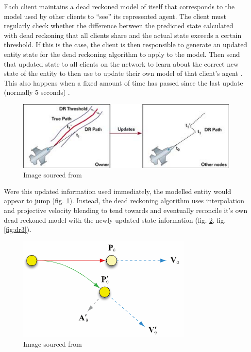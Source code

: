 \documentclass[journal]{IEEEtran}
\begin{document}
Each client maintains a dead reckoned model of itself that corresponds to the model used by other clients to ``see'' its represented agent. The client must regularly check whether the difference between the predicted state calculated with dead reckoning that all clients share and the actual state exceeds a certain threshold. If this is the case, the client is then responsible to generate an updated entity state for the dead reckoning algorithm to apply to the model. Then send that updated state to all clients on the network to learn about the correct new state of the entity to then use to update their own model of that client's agent \cite{calvin1993simnet} \cite{mauve2000keep}. This also happens when a fixed amount of time has passed since the last update (normally 5 seconds) \cite{mills1992network}.

\begin{figure}[h]
    \centering
    \includegraphics[width=1.0\linewidth]{Threshold1.png}
    \caption{Image sourced from \cite{aronson1997gamasutra}}
    \label{fig:threshold}
\end{figure}

Were this updated information used immediately, the modelled entity would appear to jump (fig. \ref{fig:threshold}). Instead, the dead reckoning algorithm uses interpolation and projective velocity blending \cite{murphy2011believable} to tend towards and eventually reconcile it's own dead reckoned model with the newly updated state information (fig. \ref{fig:dr2}, fig. \ref{fig:dr3}).

\begin{figure}[h]
    \centering
    \includegraphics[width=0.8\linewidth]{DR2.png}
    \caption{Image sourced from \cite{murphy2011believable}}
    \label{fig:dr2}
\end{figure}
\end{document}
